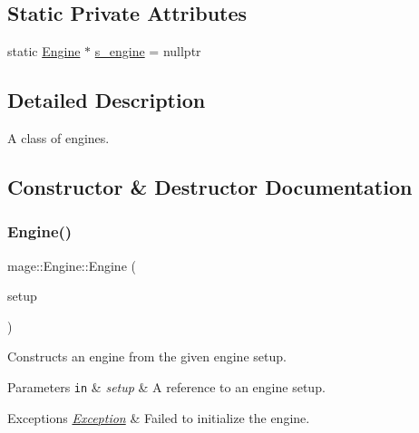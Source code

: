 \subsection*{Static Private Attributes}
\begin{DoxyCompactItemize}
\item 
static \hyperlink{classmage_1_1_engine}{Engine} $\ast$ \hyperlink{classmage_1_1_engine_a95fd10c9b9dfe0fc9cbbcb441c910240}{s\+\_\+engine} = nullptr
\end{DoxyCompactItemize}


\subsection{Detailed Description}
A class of engines. 

\subsection{Constructor \& Destructor Documentation}
\hypertarget{classmage_1_1_engine_a99770cbb017b29c284d7f8e4c7e2b84c}{}\label{classmage_1_1_engine_a99770cbb017b29c284d7f8e4c7e2b84c} 
\subsubsection{\texorpdfstring{Engine()}{Engine()}\hspace{0.1cm}{\footnotesize\ttfamily [1/3]}}
{\footnotesize\ttfamily mage\+::\+Engine\+::\+Engine (\begin{DoxyParamCaption}\item[{const \hyperlink{classmage_1_1_engine_setup}{Engine\+Setup} \&}]{setup }\end{DoxyParamCaption})\hspace{0.3cm}{\ttfamily [explicit]}}

Constructs an engine from the given engine setup.


\begin{DoxyParams}[1]{Parameters}
\mbox{\tt in}  & {\em setup} & A reference to an engine setup. \\
\hline
\end{DoxyParams}

\begin{DoxyExceptions}{Exceptions}
{\em \hyperlink{classmage_1_1_exception}{Exception}} & Failed to initialize the engine. \\
\hline
\end{DoxyExceptions}
\hypertarget{classmage_1_1_engine_afd2f4f32b2e803f59521aafe1924f0ba}{}\label{classmage_1_1_engine_afd2f4f32b2e803f59521aafe1924f0ba} 
